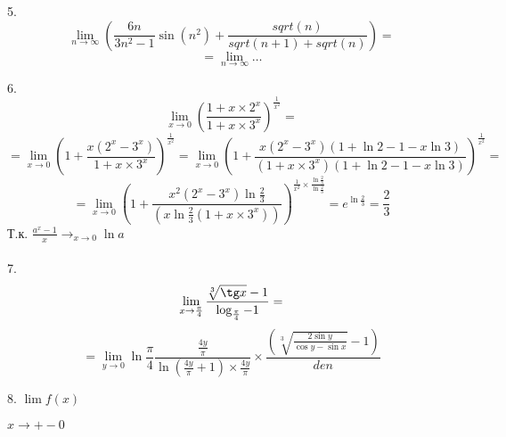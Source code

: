 \documentclass[a4paper,12pt]{article}
\begin{document}
5. \[\lim_{n\to \infty}\left(\frac{6n}{3n^2-1}\sin(n^2)+\frac{sqrt(n)}{sqrt(n+1)+sqrt(n)}\right)=
\]
\[= \lim_{n\to \infty}\dots\]


6. \[\lim_{x\to 0}\left(\frac{1+x\times 2^x}{1+x\times 3^x}\right)^{\frac{1}{x^2}}=\]
\[=\lim_{x\to 0}\left(1+\frac{x(2^x-3^x)}{1+x\times 3^x}\right)^{\frac{1}{x^2}}=
\lim_{x\to 0}\left(1+\frac{x(2^x-3^x)(1+\ln 2-1-x\ln 3)}{(1+x\times 3^x)(1+\ln 2-1-x\ln 3)}\right)^{\frac{1}{x^2}}=
\]
\[=\lim_{x\to 0}\left(1+\frac{x^2(2^x-3^x)\ln \frac{2}{3}}{(x\ln \frac{2}{3}(1+x\times 3^x))}\right)^{\frac{1}{x^2}\times \frac{\ln \frac{2}{3}}{\ln \frac{2}{3}}}=e^{\ln \frac{2}{3}}=\frac{2}{3}\]
Т.к. $\frac{a^x-1}{x} \rightarrow_{x\to 0} \ln a$ \\ \\
7. \[\lim_{x\to \frac{\pi}{4}} \frac{\sqrt[3]{\tg x}-1}{\log_{\frac{\pi}{4}}-1}= \]
\[=\lim_{y\to 0}\ln \frac{\pi}{4} \frac{\frac{4y}{\pi}}{\ln (\frac{4y}{\pi}+1)\times \frac{4y}{\pi}}\times \frac{\left(\sqrt[3]{\frac{2\sin y}{\cos y-\sin x}}-1\right)}{den}
\]

8. $\lim f(x)$

$x\to +-0$
\end{document}
